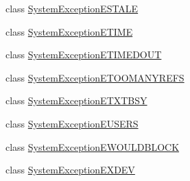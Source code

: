 \begin{DoxyCompactItemize}
\item 
class \hyperlink{class_communication_1_1_exception_1_1_system_exception_e_s_t_a_l_e}{System\+Exception\+E\+S\+T\+A\+L\+E}
\item 
class \hyperlink{class_communication_1_1_exception_1_1_system_exception_e_t_i_m_e}{System\+Exception\+E\+T\+I\+M\+E}
\item 
class \hyperlink{class_communication_1_1_exception_1_1_system_exception_e_t_i_m_e_d_o_u_t}{System\+Exception\+E\+T\+I\+M\+E\+D\+O\+U\+T}
\item 
class \hyperlink{class_communication_1_1_exception_1_1_system_exception_e_t_o_o_m_a_n_y_r_e_f_s}{System\+Exception\+E\+T\+O\+O\+M\+A\+N\+Y\+R\+E\+F\+S}
\item 
class \hyperlink{class_communication_1_1_exception_1_1_system_exception_e_t_x_t_b_s_y}{System\+Exception\+E\+T\+X\+T\+B\+S\+Y}
\item 
class \hyperlink{class_communication_1_1_exception_1_1_system_exception_e_u_s_e_r_s}{System\+Exception\+E\+U\+S\+E\+R\+S}
\item 
class \hyperlink{class_communication_1_1_exception_1_1_system_exception_e_w_o_u_l_d_b_l_o_c_k}{System\+Exception\+E\+W\+O\+U\+L\+D\+B\+L\+O\+C\+K}
\item 
class \hyperlink{class_communication_1_1_exception_1_1_system_exception_e_x_d_e_v}{System\+Exception\+E\+X\+D\+E\+V}
\end{DoxyCompactItemize}
